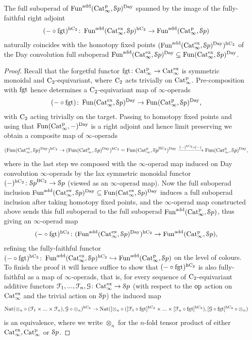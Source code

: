 \begin{lemma}
\label{lemma:sanity-check}%
The full suboperad of $\Funadd(\Catp,\Spa)^{\Day}$ spanned by the image of the fully-faithful right adjoint 
\[
(- \circ \fgt)^\hC \colon \Funadd(\Catx,\Spa)^{\hC} \to \Funadd(\Catp,\Spa)
\]
naturally coincides with the homotopy fixed points $(\Funadd(\Catx,\Spa)^{\Day})^{\hC}$ of the Day convolution full suboperad $\Funadd(\Catx,\Spa)^{\Day} \subseteq \Fun(\Catx,\Spa)^{\Day}$. 
\end{lemma}
\begin{proof}
Recall that the forgetful functor $\fgt\colon \Catp \to \Catx$ is symmetric monoidal and $\Ct$-equivariant, where $\Ct$ acts trivially on $\Catp$. Pre-composition with $\fgt$ hence determines a $\Ct$-equivariant map of $\infty$-operads
\[
(-\circ \fgt)\colon \Fun(\Catx,\Spa)^{\Day} \to \Fun(\Catp,\Spa)^{\Day} ,
\]
with $\Ct$ acting trivially on the target.
Passing to homotopy fixed points and using that $\Fun(\Catp,-)^{\Day}$ is a right adjoint and hence limit preserving we obtain a composite map of $\infty$-operads
\[
(\Fun(\Catx,\Spa)^{\Day})^{\hC} \to (\Fun(\Catp,\Spa)^{\Day})^{\hC}  = \Fun(\Catp,\Spa^{\B\Ct})^{\Day} \xrightarrow{(-)^{\hC}\circ (-)} \Fun(\Catp,\Spa)^{\Day} ,
\]
where in the last step we composed with the $\infty$-operad map induced on Day convolution $\infty$-operads by the lax symmetric monoidal functor $(-)^{\hC}\colon \Spa^{\B\Ct} \to \Spa$ (viewed as an $\infty$-operad map). Now the full suboperad inclusion $\Funadd(\Catx,\Spa)^{\Day} \subseteq \Fun(\Catx,\Spa)^{\Day}$ induces a full suboperad inclusion after taking homotopy fixed points, and the $\infty$-operad map constructed above sends this full suboperad to the full suboperad $\Funadd(\Catp,\Spa)$, thus giving an $\infty$-operad map
\[
(-\circ \fgt)^{\hC}\colon (\Funadd(\Catx,\Spa)^{\Day})^{\hC} \to \Funadd(\Catp,\Spa),
\]
refining the fully-faithful functor $(-\circ \fgt)^{\hC}\colon \Funadd(\Catx,\Spa)^{\hC} \hrar \Funadd(\Catp,\Spa)$ on the level of colours. To finish the proof it will hence suffice to show that $(-\circ \fgt)^{\hC}$ is also fully-faithful as a map of $\infty$-operads, that is, for every sequence of $\Ct$-equivariant additive functors $\F_1,...,\F_n,\G\colon \Catx \to \Spa$ (with respect to the $\mop$ action on $\Catx$ and the trivial action on $\Spa$) the induced map
\[
\Nat(\otimes_n \circ (\F_1 \times ... \times \F_n),\G \circ \otimes_n)^{\hC} \to \Nat([\otimes_n \circ ([\F_1 \circ \fgt]^{\hC} \times ... \times [\F_n \circ \fgt]^{\hC}),[\G \circ \fgt]^{\hC} \circ \otimes_n)
\]
is an equivalence, where we write $\otimes_n$ for the $n$-fold tensor product of either $\Catx,\Catp$ or $\Spa$. 

\end{proof}
